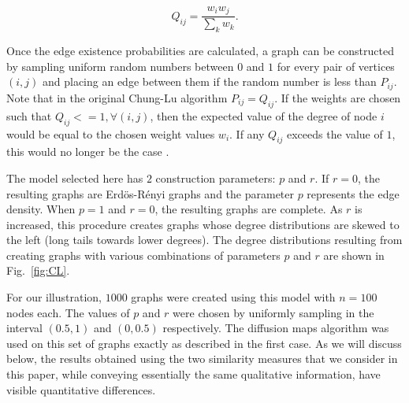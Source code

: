 \begin{equation}\label{}
  Q_{ij} = \frac{w_iw_j}{\sum_{k}{w_k}}.
\end{equation}

Once the edge existence probabilities are calculated, a graph can be
constructed by sampling uniform random numbers between $0$ and $1$ for
every pair of vertices $(i,j)$ and placing an edge between them if the
random number is less than $P_{ij}$.
% 
Note that in the original Chung-Lu algorithm $P_{ij}=Q_{ij}$.
% 
If the weights are chosen such that $Q_{ij} <= 1, \forall (i,j)$, then
the expected value of the degree of node $i$ would be equal to the
chosen weight values $w_i$.
% 
If any $Q_{ij}$ exceeds the value of $1$, this would no longer be the
case \cite{Chun02connected}.

% 

The model selected here has $2$ construction parameters: $p$ and $r$.
% 
If $r=0$, the resulting graphs are Erd\"{o}s-R\'{e}nyi graphs and the
parameter $p$ represents the edge density.
% 
When $p=1$ and $r=0$, the resulting graphs are complete.
% 
As $r$ is increased, this procedure creates graphs whose degree
distributions are skewed to the left (long tails towards lower
degrees).
% 
The degree distributions resulting from creating graphs with various
combinations of parameters $p$ and $r$ are shown in Fig.~\ref{fig:CL}.
% 

For our illustration, $1000$ graphs were created using this model with
$n=100$ nodes each.
% 
The values of $p$ and $r$ were chosen by uniformly sampling in the
interval $(0.5,1)$ and $(0,0.5)$ respectively.
% 
The diffusion maps algorithm was used on this set of graphs exactly as
described in the first case.
% 
As we will discuss below, the results obtained using the two
similarity measures that we consider in this paper, while conveying
essentially the same qualitative information, have visible
quantitative differences.
% 


